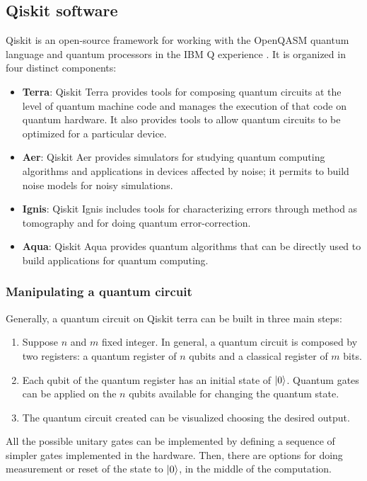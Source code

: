 \subsection{Qiskit software}
Qiskit is an open-source framework for working with the OpenQASM quantum language and quantum processors in the IBM Q experience \cite{DocumentationQiskit}.
It is organized in four distinct components:
\begin{itemize}
\item \textbf{Terra}: Qiskit Terra provides tools for composing quantum circuits at the level of quantum machine code and manages the execution of that code on quantum hardware. It also provides tools to 					allow quantum circuits to be optimized for a particular device.
\item \textbf{Aer}: Qiskit Aer provides simulators for studying quantum computing algorithms and applications in devices affected by noise; it permits to build noise models for noisy simulations.
\item \textbf{Ignis}: Qiskit Ignis includes tools for characterizing errors through method as tomography and for doing quantum error-correction.
\item \textbf{Aqua}: Qiskit Aqua provides quantum algorithms that can be directly used to build applications for quantum computing.
\end{itemize}


\subsubsection{Manipulating a quantum circuit}

Generally, a quantum circuit on Qiskit terra can be built in three main steps:
\begin{enumerate}
	\item Suppose $n$ and $m$ fixed integer. In general, a quantum circuit is composed by two registers: a quantum register of $n$ qubits and a classical register of $m$ bits.
	\item Each qubit of the quantum register has an initial state of $\left| 0 \right \rangle$. Quantum gates can be applied on the $n$ qubits available for changing the quantum state.
	\item The quantum circuit created can be visualized choosing the desired output.
\end{enumerate}
\vspace{0.2cm}
\noindent All the possible unitary gates can be implemented by defining a sequence of simpler gates implemented in the hardware. Then, there are options for doing measurement or reset of the state to $\left| 0 \right \rangle$, in the middle of the computation.

